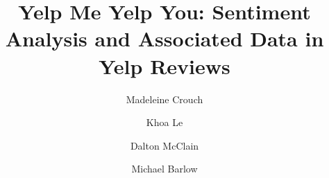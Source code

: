 \documentclass[acmtog]{acmart}
\begin{document}
\title{Yelp Me Yelp You: Sentiment Analysis and Associated Data in Yelp Reviews} 
\author{Madeleine Crouch}
\author{Khoa Le}
\author{Dalton McClain}
\author{Michael Barlow}



\maketitle

\renewcommand{\shortauthors}{M. Crouch et al.}


\end{document}
